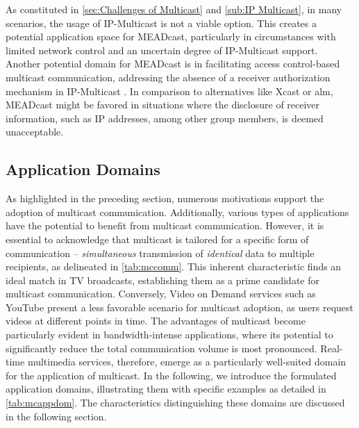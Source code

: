 As constituted in \autoref{sec:Challenges of Multicast} and
    \autoref{sub:IP Multicast}, in many scenarios, the usage of IP-Multicast
    is not a viable option.
This creates a potential application space for MEADcast, particularly in
    circumstances with limited network control and an uncertain degree of
    IP-Multicast support.
Another potential domain for MEADcast is in facilitating access control-based
    multicast communication, addressing the absence of a receiver authorization
    mechanism in IP-Multicast \cite{diot2000deployment}.
In comparison to alternatives like Xcast or \gls{alm}, MEADcast might be
    favored in situations where the disclosure of receiver information, such as
    IP addresses, among other group members, is deemed unacceptable.


\subsection{Application Domains} %
\label{sub:Application Domains}
As highlighted in the preceding section, numerous motivations support the
    adoption of multicast communication.
Additionally, various types of applications have the potential to benefit
    from multicast communication.
However, it is essential to acknowledge that multicast is tailored for a
    specific form of communication -- \textit{simultaneous} transmission of 
    \textit{identical} data to multiple recipients, as delineated in
    \autoref{tab:mccomm}.
This inherent characteristic finds an ideal match in TV broadcasts,
    establishing them as a prime candidate for multicast communication.
Conversely, Video on Demand services such as YouTube present a less favorable
    scenario for multicast adoption, as users request videos at different
    points in time.
The advantages of multicast become particularly evident in bandwidth-intense
    applications, where its potential to significantly reduce the total
    communication volume is most pronounced.
Real-time multimedia services, therefore, emerge as a particularly well-suited
    domain for the application of multicast.
In the following, we introduce the formulated application domains, illustrating
    them with specific examples as detailed in \autoref{tab:mcappdom}.
The characteristics distinguishing these domains are discussed in the
    following section.

